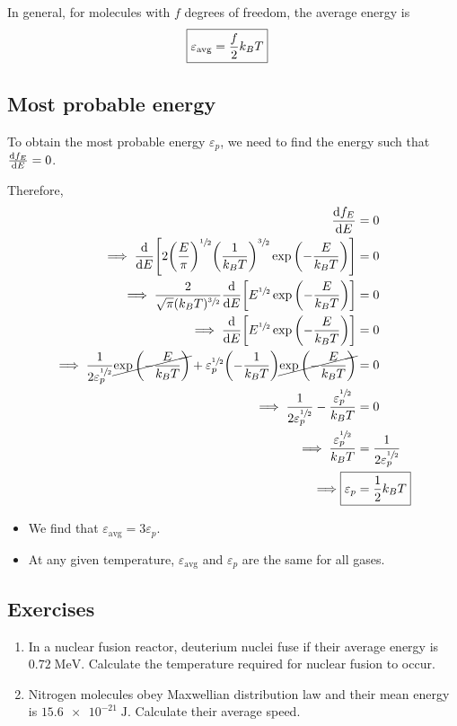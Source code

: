 		In general, for molecules with $f$ degrees of freedom, the average energy is
		\begin{align*}
			\Aboxed{\varepsilon_\text{avg}&=\dfrac{f}{2}k_BT}
		\end{align*}
	
	\subsection{Most probable energy}
		To obtain the most probable energy $\varepsilon_p$, we need to find the energy such that $\dv{f_E}{E}=0$.
		
		Therefore,
		\begin{align*}
			\dv{f_E}{E}&=0 \\
			\implies\dv{E}\qty[2\qty(\dfrac{E}{\pi})^{\sfrac{1}{2}}\qty(\dfrac{1}{k_BT})^{\sfrac{3}{2}}\exp\qty(-\dfrac{E}{k_BT})]&=0 \\
			\implies\dfrac{2}{\sqrt{\pi}(k_BT)^{\sfrac{3}{2}}}\dv{E}\qty[E^{\sfrac{1}{2}}\exp\qty(-\dfrac{E}{k_BT})]&=0 \\
			\implies\dv{E}\qty[E^{\sfrac{1}{2}}\exp\qty(-\dfrac{E}{k_BT})]&=0 \\
			\implies\dfrac{1}{2\varepsilon_p^{\sfrac{1}{2}}}\cancel{\exp\qty(-\dfrac{E}{k_BT})}+\varepsilon_p^{\sfrac{1}{2}}\qty(-\dfrac{1}{k_BT})\cancel{\exp\qty(-\dfrac{E}{k_BT})}&=0 \\
			\implies\dfrac{1}{2\varepsilon_p^{\sfrac{1}{2}}}-\dfrac{\varepsilon_p^{\sfrac{1}{2}}}{k_BT}&=0 \\
			\implies\dfrac{\varepsilon_p^{\sfrac{1}{2}}}{k_BT}&=\dfrac{1}{2\varepsilon_p^{\sfrac{1}{2}}} \\
			\implies\Aboxed{\varepsilon_p&=\dfrac{1}{2}k_BT}
		\end{align*}
		
		\begin{itemize}
			\item We find that $\varepsilon_\text{avg}=3\varepsilon_p$.
			
			\item At any given temperature, $\varepsilon_\text{avg}$ and $\varepsilon_p$ are the same for all gases.
		\end{itemize}
		
	\subsection*{Exercises}
		\begin{enumerate}
			\item In a nuclear fusion reactor, deuterium nuclei fuse if their average energy is $0.72\;\unit{\mega\electronvolt}$. Calculate the temperature required for nuclear fusion to occur.
			
			\item Nitrogen molecules obey Maxwellian distribution law and their mean energy is $\num{15.6e-21}\;\unit{\joule}$. Calculate their average speed.
		\end{enumerate}